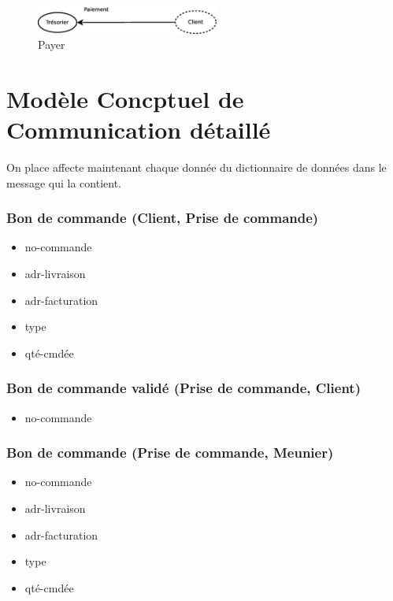 \begin{figure}[!htb]
    \begin{center}
    \includegraphics[width=6cm]{images/cc1_mcc6.eps}
    \caption{\label{cc1_mcc4} Payer}
    \end{center}
\end{figure}

\newpage
\section*{Modèle Concptuel de Communication détaillé}

On place affecte maintenant chaque donnée du dictionnaire de données dans le message qui la contient.

\subsubsection*{Bon de commande (Client, Prise de commande)}
\begin{itemize}
    \item no-commande
    \item adr-livraison
    \item adr-facturation
    \item type
    \item qté-cmdée
\end{itemize}

\subsubsection*{Bon de commande validé (Prise de commande, Client)}
\begin{itemize}
    \item no-commande
\end{itemize}

\subsubsection*{Bon de commande (Prise de commande, Meunier)}
\begin{itemize}
    \item no-commande
    \item adr-livraison
    \item adr-facturation
    \item type
    \item qté-cmdée
\end{itemize}

